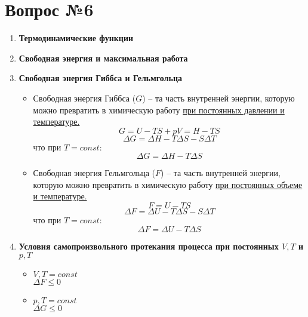 \documentclass[14pt,a4paper]{scrartcl}
\begin{document}
\section*{Вопрос №6}
\begin{enumerate}[label=\arabic*)]
	\item \textbf{Термодинамические функции} \\
	
	\item \textbf{Свободная энергия и максимальная работа} \\
	\item \textbf{Свободная энергия Гиббса и Гельмгольца} \\
	\begin{itemize}
		\item Свободная энергия Гиббса ($G$) -- та часть внутренней энергии, которую можно превратить в химическую работу \ul{при постоянных давлении и температуре.}
		\[
		G = U - TS + pV = H - TS
		\]
		\[
		\Delta{G} = \Delta{H} - T \Delta{S} - S \Delta{T}
		\]
		что при $T = const$:
		\[
		\Delta{G} = \Delta{H} - T \Delta{S} 
		\]
		\item Свободная энергия Гельмгольца ($F$) -- та часть внутренней энергии, которую можно превратить в химическую работу \ul{при постоянных объеме и температуре.} 
		\[
		F = U -TS
		\]
		\[
		\Delta{F} = \Delta{U} - T \Delta{S} - S \Delta{T}
		\]
		что при $T = const$:
		\[
		\Delta{F} = \Delta{U} - T \Delta{S} 
		\]
		
	\end{itemize}
	\item \textbf{Условия самопроизвольного протекания процесса при постоянных $V, T$ и $p, T$} \\
	\begin{itemize}
		\item $ V, T = const $ \\
		$ \Delta{F} \leqslant 0 $
		\item $ p, T = const$ \\
		$ \Delta{G} \leqslant 0 $
	\end{itemize}
	

\end{enumerate}
\end{document}
